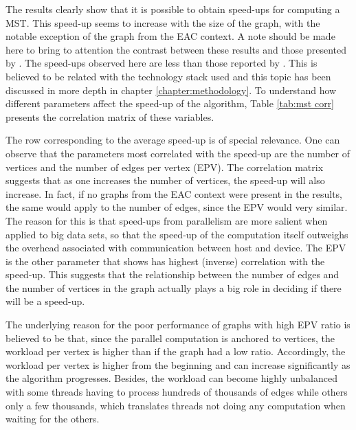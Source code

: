 The results clearly show that it is possible to obtain speed-ups for computing a MST.
This speed-up seems to increase with the size of the graph, with the notable exception of the graph from the EAC context.
A note should be made here to bring to attention the contrast between these results and those presented by \citet{Sousa2015}.
The speed-ups observed here are less than those reported by \citet{Sousa2015}.
This is believed to be related with the technology stack used and this topic has been discussed in more depth in chapter \ref{chapter:methodology}.
To understand how different parameters affect the speed-up of the algorithm, Table \ref{tab:mst corr} presents the correlation matrix of these variables.



The row corresponding to the average speed-up is of special relevance.
One can observe that the parameters most correlated with the speed-up are the number of vertices and the number of edges per vertex (EPV).
The correlation matrix suggests that as one increases the number of vertices, the speed-up will also increase.
In fact, if no graphs from the EAC context were present in the results, the same would apply to the number of edges, since the EPV would very similar.
The reason for this is that speed-ups from parallelism are more salient when applied to big data sets, so that the speed-up of the computation itself outweighs the overhead associated with communication between host and device.
The EPV is the other parameter that shows has highest (inverse) correlation with the speed-up.
This suggests that the relationship between the number of edges and the number of vertices in the graph actually plays a big role in deciding if there will be a speed-up.

The underlying reason for the poor performance of graphs with high EPV ratio is believed to be that, since the parallel computation is anchored to vertices, the workload per vertex is higher than if the graph had a low ratio.
Accordingly, the workload per vertex is higher from the beginning and can increase significantly as the algorithm progresses.
Besides, the workload can become highly unbalanced with some threads having to process hundreds of thousands of edges while others only a few thousands, which translates threads not doing any computation when waiting for the others.

